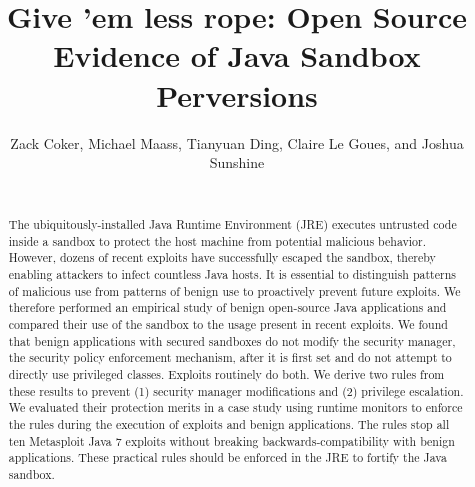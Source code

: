 \documentclass{sig-alternate}
\begin{document}
\newcommand{\minisec}[1]{\vspace{2ex}\noindent\textbf{#1}}

\lstset{language=Java}

\title{Give 'em less rope: Open Source Evidence of Java Sandbox Perversions}

\author{\alignauthor Zack Coker, Michael Maass, Tianyuan Ding, Claire Le Goues, and Joshua Sunshine \\
 \\
} 

\maketitle
\thispagestyle{plain} 
\pagestyle{plain}
\begin{abstract}
The ubiquitously-installed Java Runtime Environment (JRE) executes
untrusted code inside a sandbox to protect the host machine from potential
malicious behavior. However, dozens of recent exploits have successfully
escaped the sandbox, thereby enabling attackers to infect countless
Java hosts. It is essential to distinguish patterns of malicious use
from patterns of benign use to proactively prevent future exploits.
We therefore performed an empirical study of benign open-source Java
applications and compared their use of the sandbox to the usage present
in recent exploits. We found that benign applications with secured
sandboxes do not modify the security manager, the security policy
enforcement mechanism, after it is first set and do not attempt to
directly use privileged classes. Exploits routinely do both. We derive two rules from these results to prevent (1) security manager modifications and (2) privilege escalation. We evaluated their protection merits in a case study using runtime monitors to enforce the rules during the execution of exploits and benign applications. The rules stop all ten Metasploit Java 7 exploits without breaking backwards-compatibility with benign applications. These practical rules should be enforced in the JRE to fortify the Java sandbox.
\end{abstract}
\end{document}
